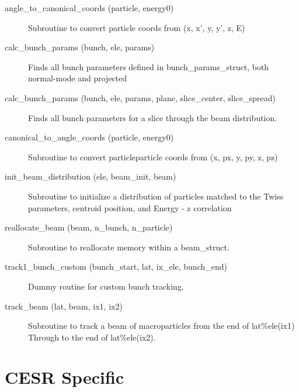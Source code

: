 \begin{description}

\item[angle_to_canonical_coords (particle, energy0)] \Newline 
Subroutine to convert particle coords from 
    (x, x', y, y', z, E)

\item[calc_bunch_params (bunch, ele, params)] \Newline 
Finds all bunch parameters defined in bunch_params_struct, both normal-mode
and projected

\item[calc_bunch_params (bunch, ele, params, plane, slice_center, slice_spread)] \Newline 
Finds all bunch parameters for a slice through the beam distribution.

\item[canonical_to_angle_coords (particle, energy0)] \Newline 
Subroutine to convert particleparticle coords from 
    (x, px, y, py, z, pz)

\item[init_beam_distribution (ele, beam_init, beam)] \Newline 
Subroutine to initialize a distribution of particles matched to
the Twiss parameters, centroid position, and Energy - z correlation

\item[reallocate_beam (beam, n_bunch, n_particle)] \Newline 
Subroutine to reallocate memory within a beam_struct.

\item[track1_bunch_custom (bunch_start, lat, ix_ele, bunch_end)] \Newline 
Dummy routine for custom bunch tracking. 

\item[track_beam (lat, beam, ix1, ix2)] \Newline 
     Subroutine to track a beam of macroparticles from the end of
     lat\%ele(ix1) Through to the end of lat\%ele(ix2).

\end{description}

\section{CESR Specific}
\label{r:cesr}

